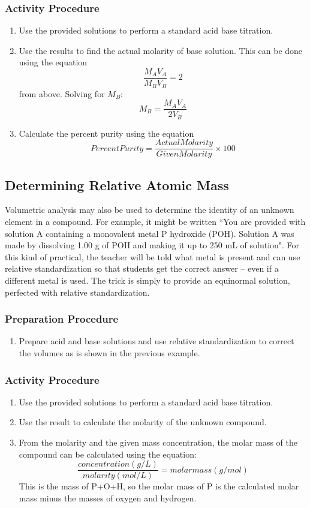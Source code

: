 \subsubsection{Activity Procedure}
\begin{enumerate}
\item {Use the provided solutions to perform a standard acid base titration.}
\item{Use the results to find the actual molarity of base solution. This can be done using the equation 
$$\frac{M_A V_A}{M_B V_B}=2$$
from above. Solving for $M_B$:
$$M_B=\frac{M_A V_A}{2V_B}$$}
\item {Calculate the percent purity using the equation
$$Percent Purity = \frac{Actual  Molarity}{Given  Molarity}\times 100$$}
\end{enumerate}

\subsection{Determining Relative Atomic Mass}

Volumetric analysis may also be used to determine the identity of an unknown element in a compound. For example, it might be written ``You are provided with solution A containing a monovalent metal P hydroxide (POH). Solution A was made by dissolving 1.00 g of POH and making it up to 250 mL of solution". For this kind of practical, the teacher will be told what metal is present and can use relative standardization so that students get the correct answer -- even if a different metal is used. The trick is simply to provide an equinormal solution, perfected with relative standardization.

\subsubsection{Preparation Procedure}
\begin{enumerate}
\item{Prepare acid and base solutions and use relative standardization to correct the volumes as is shown in the previous example.}
\end{enumerate}
\subsubsection{Activity Procedure}
\begin{enumerate}
\item{Use the provided solutions to perform a standard acid base titration.}
\item{Use the result to calculate the molarity of the unknown compound.}
\item{From the molarity and the given mass concentration, the molar mass of the compound can be calculated using the equation: 
$$\frac{concentration(g/L)}{molarity(mol/L)}={molar mass(g/mol)}$$
This is the mass of P+O+H, so the molar mass of P is the calculated molar mass minus the masses of oxygen and hydrogen.}
\end{enumerate}

